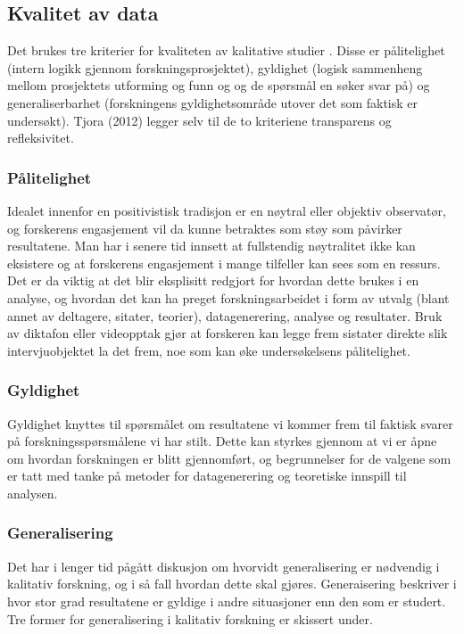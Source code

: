 \subsection{Kvalitet av data}
\label{kvalitet av data}

Det brukes tre kriterier for kvaliteten av kalitative studier \cite{Tjora}. Disse er pålitelighet (intern logikk gjennom forskningsprosjektet), gyldighet (logisk sammenheng mellom prosjektets utforming og funn og og de spørsmål en søker svar på) og generaliserbarhet (forskningens gyldighetsområde utover det som faktisk er undersøkt). Tjora (2012) legger selv til de to kriteriene transparens og refleksivitet. 

\subsubsection{Pålitelighet}
Idealet innenfor en positivistisk tradisjon er en nøytral eller objektiv observatør, og forskerens engasjement vil da kunne betraktes som støy som påvirker resultatene. Man har i senere tid innsett at fullstendig nøytralitet ikke kan eksistere og at forskerens engasjement i mange tilfeller kan sees som en ressurs. Det er da viktig at det blir eksplisitt redgjort for hvordan dette brukes i en analyse, og hvordan det kan ha preget forskningsarbeidet i form av utvalg (blant annet av deltagere, sitater, teorier), datagenerering, analyse og resultater. Bruk av diktafon eller videopptak gjør at forskeren kan legge frem sistater direkte slik intervjuobjektet la det frem, noe som kan øke undersøkelsens pålitelighet. 

\subsubsection{Gyldighet}
Gyldighet knyttes til spørsmålet om resultatene vi kommer frem til faktisk svarer på forskningsspørsmålene vi har stilt. Dette kan styrkes gjennom at vi er åpne om hvordan forskningen er blitt gjennomført, og begrunnelser for de valgene som er tatt med tanke på metoder for datagenerering og teoretiske innspill til analysen. 

\subsubsection{Generalisering}
Det har i lenger tid pågått diskusjon om hvorvidt generalisering er nødvendig i kalitativ forskning, og i så fall hvordan dette skal gjøres. Generaisering beskriver i hvor stor grad resultatene er gyldige i andre situasjoner enn den som er studert. Tre former for generalisering i kalitativ forskning er skissert under.

